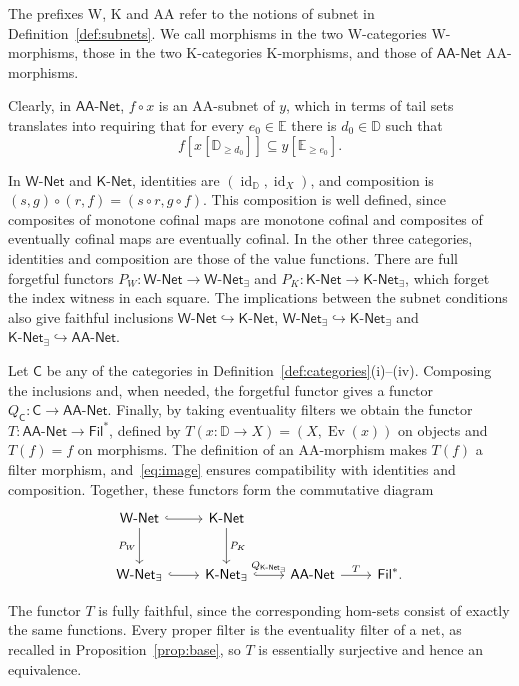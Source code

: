 \documentclass[11pt,a4paper]{article}
\theoremstyle{definition}
\theoremstyle{remark}
\newcommand{\Filp}{\mathsf{Fil}^{*}}
\newcommand{\Wpar}{\mathsf{W\text{-}Net}}
\newcommand{\Kpar}{\mathsf{K\text{-}Net}}
\newcommand{\Wex}{\mathsf{W\text{-}Net}_{\exists}}
\newcommand{\Kex}{\mathsf{K\text{-}Net}_{\exists}}
\newcommand{\NetAA}{\mathsf{AA\text{-}Net}}
\newcommand{\CC}{\mathsf C}
\newcommand{\Ev}{\operatorname{Ev}}
\newcommand{\id}{\operatorname{id}}
\begin{document}
The prefixes W, K and AA refer to the notions of subnet in
Definition~\ref{def:subnets}. We call morphisms in the two
W-categories W-morphisms, those in the two K-categories K-morphisms,
and those of \(\NetAA\) AA-morphisms.

\medskip
Clearly, in \(\NetAA\), \(f\circ x\) is an AA-subnet
of \(y\), which in terms of tail sets translates into requiring that
for every \(e_0\in\mathbb{E}\) there is \(d_0\in\mathbb{D}\) such that
\begin{equation}\label{eq:aaquant}
 f[x[\mathbb{D}_{\ge d_0}]]\subseteq y[\mathbb{E}_{\ge e_0}].
\end{equation}

In \(\Wpar\) and \(\Kpar\), identities are
\((\id_{\mathbb{D}},\id_X)\), and composition is
\((s,g)\circ(r,f)=(s\circ r,g\circ f)\). This composition is well
defined, since composites of monotone cofinal maps are monotone
cofinal and composites of eventually cofinal maps are eventually
cofinal. In the other three categories, identities and composition
are those of the value functions.
There are full forgetful functors
\(P_W:\Wpar\to\Wex\) and \(P_K:\Kpar\to\Kex\),
which forget the index witness in each square.
The implications between the subnet conditions also give faithful
inclusions \(\Wpar\hookrightarrow\Kpar\),
\(\Wex\hookrightarrow\Kex\) and \(\Kex\hookrightarrow\NetAA\).

Let \(\CC\) be any of the categories in
Definition~\ref{def:categories}(i)--(iv). Composing the inclusions
and, when needed, the forgetful functor gives a functor
\(Q_{\CC}:\CC\to\NetAA\).
Finally, by taking eventuality filters we obtain the functor
\(T:\NetAA\to\Filp\), defined by
\(T(x:\mathbb{D}\to X)=(X,\Ev(x))\) on objects and \(T(f)=f\)
on morphisms. The definition of an AA-morphism makes \(T(f)\) a
filter morphism, and~\eqref{eq:image} ensures compatibility with
identities and composition. Together, these functors form the
commutative diagram
\[
\begin{tikzcd}[column sep=2.2em,row sep=2.5em]
\Wpar \arrow[r,hook] \arrow[d,"P_W"'] &
\Kpar \arrow[d,"P_K"] \\
\Wex \arrow[r,hook] &
\Kex \arrow[r,hook,"Q_{\Kex}"] & \NetAA \arrow[r,"T"] & \Filp.
\end{tikzcd}
\]

The functor \(T\) is fully faithful, since the corresponding
hom-sets consist of exactly the same functions. Every proper
filter is the eventuality filter of a net, as recalled in
Proposition~\ref{prop:base}, so \(T\) is essentially surjective
and hence an equivalence.
\end{document}
